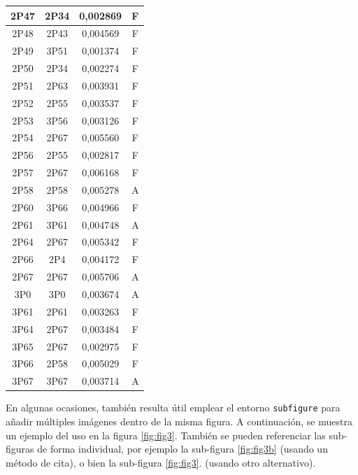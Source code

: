 \documentclass[spanish,openright]{book}
\begin{document}
\begin{center}
\begin{longtable}{|c|c|c|c|}
\hline	2P47	&	2P34	&	0,002869	&	F	\\
\hline	2P48	&	2P43	&	0,004569	&	F	\\
\hline	2P49	&	3P51	&	0,001374	&	F	\\
\hline	2P50	&	2P34	&	0,002274	&	F	\\
\hline	2P51	&	2P63	&	0,003931	&	F	\\
\hline	2P52	&	2P55	&	0,003537	&	F	\\
\hline	2P53	&	3P56	&	0,003126	&	F	\\
\hline	2P54	&	2P67	&	0,005560	&	F	\\
\hline	2P56	&	2P55	&	0,002817	&	F	\\
\hline	2P57	&	2P67	&	0,006168	&	F	\\
\hline	2P58	&	2P58	&	0,005278	&	A	\\
\hline	2P60	&	3P66	&	0,004966	&	F	\\
\hline	2P61	&	3P61	&	0,004748	&	A	\\
\hline	2P64	&	2P67	&	0,005342	&	F	\\
\hline	2P66	&	2P4	&	0,004172	&	F	\\
\hline	2P67	&	2P67	&	0,005706	&	A	\\
\hline	3P0	&	3P0	&	0,003674	&	A	\\
\hline	3P61	&	2P61	&	0,003263	&	F	\\
\hline	3P64	&	2P67	&	0,003484	&	F	\\
\hline	3P65	&	2P67	&	0,002975	&	F	\\
\hline	3P66	&	2P58	&	0,005029	&	F	\\
\hline	3P67	&	3P67	&	0,003714	&	A	\\
	\end{longtable}
\end{center}





En algunas ocasiones, también resulta útil emplear el entorno
\texttt{subfigure} para añadir múltiples imágenes dentro de la misma
figura. A continuación, se muestra un ejemplo del uso en la figura
\ref{fig:fig3}. También se pueden referenciar las sub-figuras de forma
individual, por ejemplo la sub-figura \ref{fig:fig3b} (usando un método
de cita), o bien la sub-figura \ref{fig:fig3}. (usando
otro alternativo).
\end{document}
